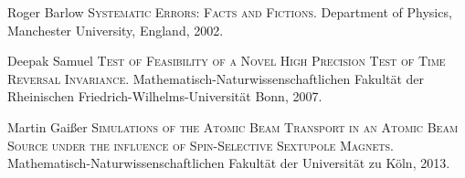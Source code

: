 \documentclass{article}
\begin{document}
\begin{thebibliography}{99}
		
		Roger Barlow
		\textsc{Systematic Errors: Facts and Fictions}.
		Department of Physics, Manchester University, England,
		2002.
		
		Deepak Samuel
		\textsc{Test of Feasibility of a Novel High Precision Test of Time Reversal Invariance}.
		Mathematisch-Naturwissenschaftlichen Fakult\"{a}t der Rheinischen Friedrich-Wilhelms-Universit\"{a}t Bonn,
		2007.
		
		Martin Gai\ss er
		\textsc{Simulations of the Atomic Beam Transport in an Atomic Beam Source under the influence of Spin-Selective Sextupole Magnets}.
		Mathematisch-Naturwissenschaftlichen Fakult\"{a}t der Universit\"{a}t zu K\"oln,
		2013.
		
		
	\end{thebibliography}
	
\end{document}
